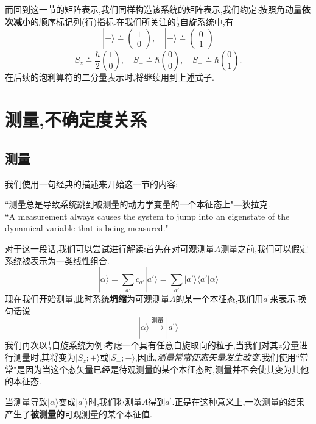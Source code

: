 \documentclass[lang=cn,newtx,10pt,scheme=chinese,thmcnt=section]{elegantbook}
\begin{document}
而回到这一节的矩阵表示,我们同样构造该系统的矩阵表示,我们约定:按照角动量\textbf{依次减小}的顺序标记列(行)指标.在我们所关注的$\frac12$自旋系统中,有
\begin{equation}
	|+\rangle\doteq\begin{pmatrix}1\\0\end{pmatrix},\quad|-\rangle\doteq\begin{pmatrix}0\\1\end{pmatrix}
\end{equation}
\begin{equation}
	S_z\doteq\frac{\hbar}{2}\binom{1}{0},\quad S_+\doteq\hbar\binom{0}{0},\quad S_-\doteq\hbar\binom{0}{1}.
\end{equation}
在后续的泡利算符的二分量表示时,将继续用到上述式子.
\section{测量,不确定度关系}
\subsection*{测量}
我们使用一句经典的描述来开始这一节的内容:
\begin{note}
	``测量总是导致系统跳到被测量的动力学变量的一个本征态上"---狄拉克.\\
	``A measurement always causes the system to jump into an eigenstate of the dynamical variable that is being measured."
\end{note}
对于这一段话,我们可以尝试进行解读:首先在对可观测量$A$测量之前,我们可以假定系统被表示为一类线性组合.
\begin{equation}
	|\alpha\rangle = \sum_{a'}c_{a'} | a' \rangle = \sum_{a'} | a' \rangle \langle a' | \alpha\rangle 
\end{equation}
现在我们开始测量,此时系统\textbf{坍缩}为可观测量$A$的某一个本征态,我们用$a^{'}$来表示.换句话说
\begin{equation}\label{eq1.3.1}
	|\alpha\rangle\xrightarrow{\text{测量}}| a^{\prime}\rangle 
\end{equation}
我们再次以$\frac12$自旋系统为例:考虑一个具有任意自旋取向的粒子,当我们对其$z$分量进行测量时,其将变为$|S_z;+\rangle$或$|S_-;-\rangle$,因此,\textit{测量常常使态矢量发生改变}.我们使用``常常"是因为当这个态矢量已经是待观测量的某个本征态时,测量并不会使其变为其他的本征态.

当测量导致$|\alpha\rangle$变成$|a^{\prime}\rangle$时,我们称测量$A$得到$a^{\prime}$.正是在这种意义上,一次测量的结果产生了\textbf{被测量的}可观测量的某个本征值.
\end{document}
